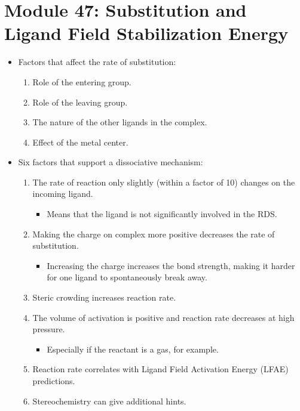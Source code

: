 \documentclass[../notes.tex]{subfiles}
\begin{document}
\section{Module 47: Substitution and Ligand Field Stabilization Energy}
\begin{itemize}
    \item {}Factors that affect the rate of substitution:
    \begin{enumerate}
        \item Role of the entering group.
        \item Role of the leaving group.
        \item The nature of the other ligands in the complex.
        \item Effect of the metal center.
    \end{enumerate}
    \item Six factors that support a dissociative mechanism:
    \begin{enumerate}
        \item The rate of reaction only slightly (within a factor of 10) changes on the incoming ligand.
        \begin{itemize}
            \item Means that the ligand is not significantly involved in the RDS.
        \end{itemize}
        \item Making the charge on complex more positive decreases the rate of substitution.
        \begin{itemize}
            \item Increasing the charge increases the bond strength, making it harder for one ligand to spontaneously break away.
        \end{itemize}
        \item Steric crowding increases reaction rate.
        \item The volume of activation is positive and reaction rate decreases at high pressure.
        \begin{itemize}
            \item Especially if the reactant is a gas, for example.
        \end{itemize}
        \item Reaction rate correlates with Ligand Field Activation Energy (LFAE) predictions.
        \item Stereochemistry can give additional hints.
        \begin{itemize}

\end{itemize}
\end{enumerate}
\end{itemize}
\end{document}
